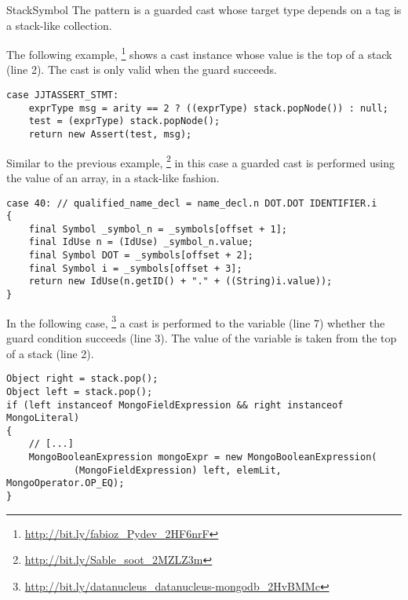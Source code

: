 \begin{pattern}{StackSymbol}
The \thisp{} pattern is a guarded cast whose target type depends on a tag is a stack-like collection.

\instances{}
The following example,%
\footnote{\url{http://bit.ly/fabioz_Pydev_2HF6nrF}}
shows a cast instance whose value is the top of a stack (line 2).
The cast is only valid when the guard succeeds.

\begin{verbatim}
case JJTASSERT_STMT:
    exprType msg = arity == 2 ? ((exprType) stack.popNode()) : null;
    test = (exprType) stack.popNode();
    return new Assert(test, msg);
\end{verbatim}

Similar to the previous example,%
\footnote{\url{http://bit.ly/Sable_soot_2MZLZ3m}}
in this case a guarded cast is performed using the value of an array,
in a stack-like fashion.

\begin{verbatim}
case 40: // qualified_name_decl = name_decl.n DOT.DOT IDENTIFIER.i
{
    final Symbol _symbol_n = _symbols[offset + 1];
    final IdUse n = (IdUse) _symbol_n.value;
    final Symbol DOT = _symbols[offset + 2];
    final Symbol i = _symbols[offset + 3];
    return new IdUse(n.getID() + "." + ((String)i.value));
}
\end{verbatim}

In the following case,%
\footnote{\url{http://bit.ly/datanucleus_datanucleus-mongodb_2HvBMMc}}
a cast is performed to the  variable (line 7)
whether the guard condition succeeds (line 3).
The value of the  variable is taken from the top of a stack (line 2).

\begin{verbatim}
Object right = stack.pop();
Object left = stack.pop();
if (left instanceof MongoFieldExpression && right instanceof MongoLiteral)
{
    // [...]
    MongoBooleanExpression mongoExpr = new MongoBooleanExpression(
            (MongoFieldExpression) left, elemLit, MongoOperator.OP_EQ);
}
\end{verbatim}



\end{pattern}
